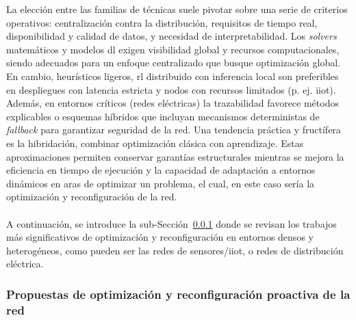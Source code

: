 La elección entre las familias de técnicas suele pivotar sobre una serie de criterios operativos: centralización contra la distribución, requisitos de tiempo real, disponibilidad y calidad de datos, y necesidad de interpretabilidad. Los \textit{solvers} matemáticos y modelos \gls{dl} exigen visibilidad global y recursos computacionales, siendo adecuados para un enfoque centralizado que busque optimización global. En cambio, heurísticos ligeros, \gls{rl}  distribuido con inferencia local son preferibles en despliegues con latencia estricta y nodos con recursos limitados (p. ej. \gls{iiot}). Además, en entornos críticos (redes eléctricas) la trazabilidad favorece métodos explicables o esquemas híbridos que incluyan mecanismos deterministas de \textit{fallback} para garantizar seguridad de la red. Una tendencia práctica y fructífera es la hibridación, combinar optimización clásica con aprendizaje. Estas aproximaciones permiten conservar garantías estructurales mientras se mejora la eficiencia en tiempo de ejecución y la capacidad de adaptación a entornos dinámicos en aras de optimizar un problema, el cual, en este caso sería la optimización y reconfiguración de la red. \\
\\
A continuación, se introduce la sub-Sección~\ref{subsubsec:propuestas_optimizacion} donde se revisan los trabajos más significativos de optimización y reconfiguración en entornos densos y heterogéneos, como pueden ser las redes de sensores/\gls{iiot}, o redes de distribución eléctrica. 


\subsubsection{Propuestas de optimización y reconfiguración proactiva de la red}
\label{subsubsec:propuestas_optimizacion}

